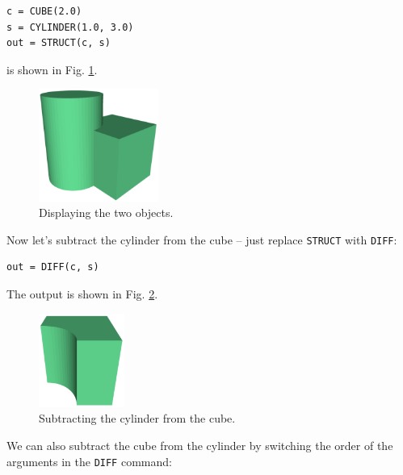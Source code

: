 \begin{bbox}
\begin{verbatim}
c = CUBE(2.0)
s = CYLINDER(1.0, 3.0)
out = STRUCT(c, s) 
\end{verbatim}
\end{bbox}
\vspace{6mm}

\noindent
is shown in Fig. \ref{fig:diff-0}.
\newpage

\begin{figure}[!ht]
\begin{center}
\includegraphics[width=0.35\textwidth]{img/diff-0.png}
\end{center}
\vspace{-4mm}
\caption{Displaying the two objects.}
\label{fig:diff-0}
\end{figure}
\noindent
Now let's subtract the cylinder from the cube -- just replace 
{\tt STRUCT} with {\tt DIFF}:\\

\begin{bbox}
\begin{verbatim}
out = DIFF(c, s) 
\end{verbatim}
\end{bbox}
\vspace{6mm}

\noindent
The output is shown in Fig. \ref{fig:diff-1}.

\begin{figure}[!ht]
\begin{center}
\includegraphics[width=0.25\textwidth]{img/diff-1.png}
\end{center}
\vspace{-4mm}
\caption{Subtracting the cylinder from the cube.}
\label{fig:diff-1}
\end{figure}
\noindent
We can also subtract the cube from the cylinder by switching 
the order of the arguments in the {\tt DIFF} command:\\

